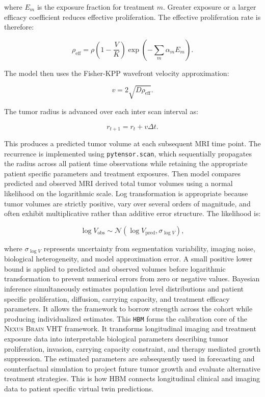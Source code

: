 where $E_m$ is the exposure fraction for treatment $m$. Greater exposure or a larger efficacy coefficient reduces effective proliferation. The effective proliferation rate is therefore:

\begin{equation}
\rho_{\mathrm{eff}}
=
\rho
\left(1-\frac{V}{K}\right)
\exp\left(-\sum_{m}\alpha_mE_m\right).
\end{equation}

The model then uses the Fisher-KPP wavefront velocity approximation:

\begin{equation}
v=2\sqrt{D\rho_{\mathrm{eff}}}.
\end{equation}

The tumor radius is advanced over each inter scan interval as:

\begin{equation}
r_{t+1}=r_t+v\Delta t.
\end{equation}

This produces a predicted tumor volume at each subsequent MRI time point. The recurrence is implemented using \texttt{pytensor.scan}, which sequentially propagates the radius across all patient time observations while retaining the appropriate patient specific parameters and treatment exposures. Then model compares predicted and observed MRI derived total tumor volumes using a normal likelihood on the logarithmic scale. Log transformation is appropriate because tumor volumes are strictly positive, vary over several orders of magnitude, and often exhibit multiplicative rather than additive error structure. The likelihood is:

\begin{equation}
\log V_{\mathrm{obs}}
\sim
\mathcal{N}
\left(
\log V_{\mathrm{pred}},
\sigma_{\log V}
\right),
\end{equation}

where $\sigma_{\log V}$ represents uncertainty from segmentation variability, imaging noise, biological heterogeneity, and model approximation error. A small positive lower bound is applied to predicted and observed volumes before logarithmic transformation to prevent numerical errors from zero or negative values. Bayesian inference simultaneously estimates population level distributions and patient specific proliferation, diffusion, carrying capacity, and treatment efficacy parameters. It allows the framework to borrow strength across the cohort while producing individualized estimates. This \texttt{HBM} forms the calibration core of the \textsc{Nexus Brain} VHT framework. It transforms longitudinal imaging and treatment exposure data into interpretable biological parameters describing tumor proliferation, invasion, carrying capacity constraint, and therapy mediated growth suppression. The estimated parameters are subsequently used in forecasting and counterfactual simulation to project future tumor growth and evaluate alternative treatment strategies. This is how HBM connects longitudinal clinical and imaging data to patient specific virtual twin predictions.



